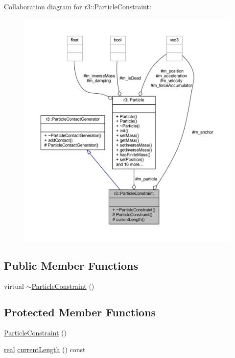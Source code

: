 Collaboration diagram for r3\+:\+:Particle\+Constraint\+:\nopagebreak
\begin{figure}[H]
\begin{center}
\leavevmode
\includegraphics[width=350pt]{classr3_1_1_particle_constraint__coll__graph}
\end{center}
\end{figure}
\subsection*{Public Member Functions}
\begin{DoxyCompactItemize}
\item 
virtual \mbox{\hyperlink{classr3_1_1_particle_constraint_aa4c9c88384c10a9e9613bdad843df524}{$\sim$\+Particle\+Constraint}} ()
\end{DoxyCompactItemize}
\subsection*{Protected Member Functions}
\begin{DoxyCompactItemize}
\item 
\mbox{\hyperlink{classr3_1_1_particle_constraint_af158845ecce7f53246f6120ad9dbd4b8}{Particle\+Constraint}} ()
\item 
\mbox{\hyperlink{namespacer3_ab2016b3e3f743fb735afce242f0dc1eb}{real}} \mbox{\hyperlink{classr3_1_1_particle_constraint_a0d466805c43b474d389609faba308cc0}{current\+Length}} () const
\end{DoxyCompactItemize}
